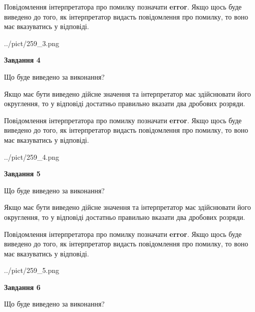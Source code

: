 \documentclass[12pt, ukrainian]{article}
\begin{document}
{\begin {Large}
Повідомлення інтерпретатора про помилку позначати \textbf{error}.
Якщо щось буде виведено до того, як інтерпретатор видасть повідомлення про помилку, 
то воно має вказуватись у відповіді. \par

\begin{center}
	{../pict/259_3.png}
\end{center}
\newpage

{\begin {center}\textbf{Завдання 4}\end {center}}\par
Що буде виведено за виконання? \par

Якщо має бути виведено дійсне значення та інтерпретатор має здійснювати його округлення, 
то у відповіді достатньо правильно вказати два дробових розряди.

Повідомлення інтерпретатора про помилку позначати \textbf{error}.
Якщо щось буде виведено до того, як інтерпретатор видасть повідомлення про помилку, 
то воно має вказуватись у відповіді. \par

\begin{center}
	{../pict/259_4.png}
\end{center}
\newpage

{\begin {center}\textbf{Завдання 5}\end {center}}\par
Що буде виведено за виконання? \par

Якщо має бути виведено дійсне значення та інтерпретатор має здійснювати його округлення, 
то у відповіді достатньо правильно вказати два дробових розряди.

Повідомлення інтерпретатора про помилку позначати \textbf{error}.
Якщо щось буде виведено до того, як інтерпретатор видасть повідомлення про помилку, 
то воно має вказуватись у відповіді. \par

\begin{center}
	{../pict/259_5.png}
\end{center}
\newpage

{\begin {center}\textbf{Завдання 6}\end {center}}\par
Що буде виведено за виконання? \par


\end{Large}}
\end{document}
